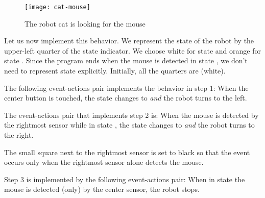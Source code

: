 \begin{figure}
\begin{center}
\texttt{[image: cat-mouse]}
\caption{The robot cat is looking for the mouse}\label{fig.cat-mouse}
\end{center}
\end{figure}

Let us now implement this behavior. We represent the state of the robot
by the upper-left quarter of the state indicator.
We choose white for state
 and orange for state .
Since the program ends when the mouse is detected in state
, we don't need to represent state 
explicitly. Initially, all the quarters are  (white).

The following event-actions pair implements the behavior in step 1:
When the center button is touched, the state changes to 
\emph{and} the robot turns to the left.

The event-actions pair that implements step 2 is:
When the mouse is detected by the rightmost sensor while in state
, the state changes to  \emph{and} the
robot turns to the right.

The small square next to the rightmost sensor is set to black so that
the event occurs only when the rightmost sensor alone detects the mouse.

Step 3 is implemented by the following event-actions pair:
When in state  the mouse is detected (only) by the
center sensor, the robot stops. 



\bigskip

\bigskip



